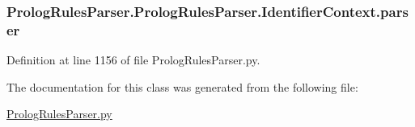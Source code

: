 \subsubsection[{parser}]{\setlength{\rightskip}{0pt plus 5cm}Prolog\+Rules\+Parser.\+Prolog\+Rules\+Parser.\+Identifier\+Context.\+parser}\label{class_prolog_rules_parser_1_1_prolog_rules_parser_1_1_identifier_context_abbd5df64720a0e1958526c13e82fd390}


Definition at line 1156 of file Prolog\+Rules\+Parser.\+py.



The documentation for this class was generated from the following file\+:\begin{DoxyCompactItemize}
\item 
\hyperlink{_prolog_rules_parser_8py}{Prolog\+Rules\+Parser.\+py}\end{DoxyCompactItemize}
